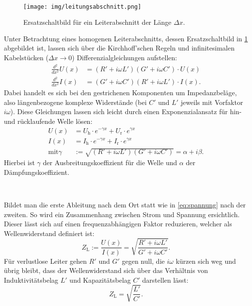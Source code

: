 	\
	
	\begin{figure}[h]
		\centering
		\texttt{[image: img/leitungsabschnitt.png]}
		\caption{Ersatzschaltbild für ein Leiterabschnitt der Länge $\Delta x$.\cite{wwu}}
		\label{fig:leiterabschnitt}
	\end{figure}
	Unter Betrachtung eines homogenen Leiterabschnitts, dessen Ersatzschaltbild in \cref{fig:leiterabschnitt} abgebildet ist, lassen sich über die Kirchhoff'schen Regeln und infinitesimalen Kabelstücken ($\Delta x \rightarrow 0$) Differenzialgleichungen aufstellen:
	\begin{align}
		\frac{d^2}{dx^2} U(x) &= (R'+i\omega L') (G'+i\omega C') \cdot U(x) \label{eq:spannung} \\
		\frac{d^2}{dx^2} I(x) &= (G'+i\omega C') (R'+i\omega L') \cdot I(x).
	\end{align}
	Dabei handelt es sich bei den gestrichenen Komponenten um Impedanzbeläge, also längenbezogene komplexe Widerstände (bei $C'$ und $L'$ jeweils mit Vorfaktor $i\omega$).
	Diese Gleichungen lassen sich leicht durch einen Exponenzialansatz für hin- und rücklaufende Welle lösen:
	\begin{align}
		U(x) &= U_\text{h}\cdot e^{-\gamma x} + U_\text{r}\cdot e^{\gamma x} \\
		I(x) &= I_\text{h}\cdot e^{-\gamma x} + I_\text{r}\cdot e^{\gamma x} \\
		\text{mit} \gamma &:= \sqrt{(R'+i\omega L') (G'+i\omega C')} = \alpha + i\beta.
	\end{align}
	Hierbei ist $\gamma$ der Ausbreitungskoeffizient für die Welle und $\alpha$ der Dämpfungskoeffizient.
	
	\
	
	Bildet man die erste Ableitung nach dem Ort statt wie in \cref{eq:spannung} nach der zweiten.
	So wird ein Zusammenhang zwischen Strom und Spannung ersichtlich.
	Dieser lässt sich auf einen frequenzabhängigen Faktor reduzieren, welcher als Wellenwiderstand definiert ist:
	\begin{equation}
		Z_\text{L} := \frac{U(x)}{I(x)} = \sqrt{\frac{R'+i\omega L'}{G'+i\omega C'}}.
	\end{equation} 
	Für verlustlose Leiter gehen $R'$ und $G'$ gegen null, die $i\omega$ kürzen sich weg und übrig bleibt, dass der Wellenwiderstand sich über das Verhältnis von Induktivitätsbelag $L'$ und Kapazitätsbelag $C'$ darstellen lässt:
	\begin{equation}
		Z_\text{L} = \sqrt{\frac{L'}{C'}}.
	\end{equation}
	
